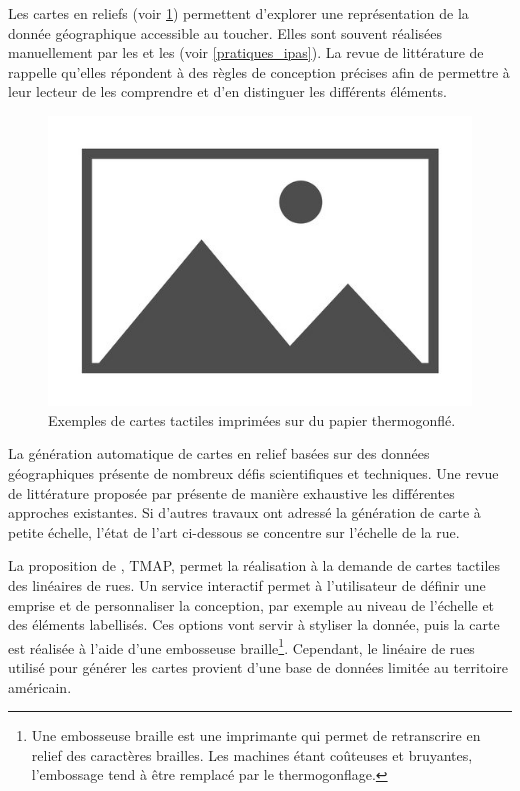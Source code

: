 Les cartes en reliefs (voir \ref{fig:excartestactiles}) permettent d'explorer une représentation de la donnée géographique accessible au toucher. Elles sont souvent réalisées manuellement par les \ipas{} et les \adts{} (voir \ref{pratiques_ipas}). La revue de littérature de \cite{Wabinski2022} rappelle qu'elles répondent à des règles de conception précises afin de permettre à leur lecteur de les comprendre et d'en distinguer les différents éléments.

\begin{figure}
    \centering
    \includegraphics{images/placeholder.jpg}
    \caption{Exemples de cartes tactiles imprimées sur du papier thermogonflé.}
    \label{fig:excartestactiles}
\end{figure}

\newpar{}

La génération automatique de cartes en relief basées sur des données géographiques présente de nombreux défis scientifiques et techniques. Une revue de littérature proposée par \cite{Wabinski2019} présente de manière exhaustive les différentes approches existantes. Si d'autres travaux ont adressé la génération de carte à petite échelle, l'état de l'art ci-dessous se concentre sur l'échelle de la rue.

La proposition de \cite{Miele2004}, TMAP, permet la réalisation à la demande de cartes tactiles des linéaires de rues. Un service interactif permet à l'utilisateur de définir une emprise et de personnaliser la conception, par exemple au niveau de l'échelle et des éléments labellisés. Ces options vont servir à styliser la donnée, puis la carte est réalisée à l'aide d'une embosseuse braille\footnote{Une embosseuse braille est une imprimante qui permet de retranscrire en relief des caractères brailles. Les machines étant coûteuses et bruyantes, l'embossage tend à être remplacé par le thermogonflage.}. Cependant, le linéaire de rues utilisé pour générer les cartes provient d'une base de données limitée au territoire américain. 

